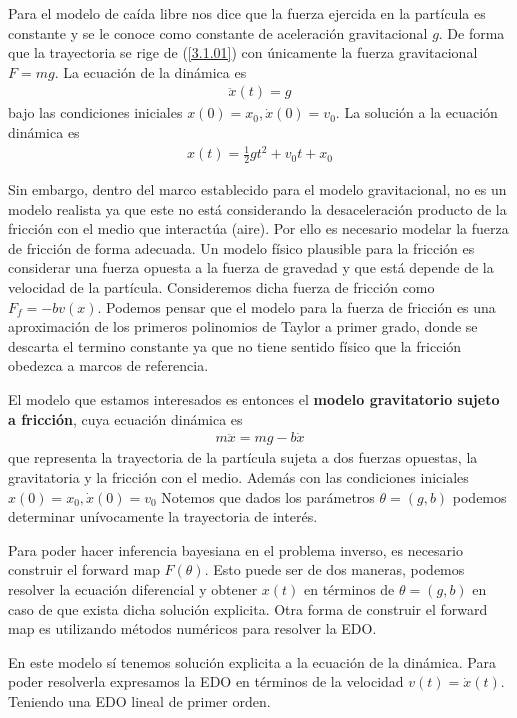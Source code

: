Para el modelo de caída libre nos dice que la fuerza ejercida en la partícula es constante y se le conoce como constante de aceleración gravitacional $g$. De forma que la trayectoria se rige de (\ref{3.1.01}) con únicamente la fuerza gravitacional $F = mg$. La ecuación de la dinámica es 
\begin{align*}
    \ddot{x}(t) = g
\end{align*}
bajo las condiciones iniciales $x(0) = x_0, \dot{x}(0) = v_0$. La solución a la ecuación dinámica es \cite{sears1986fisica}
\begin{align*}
    x(t) = \frac{1}{2}gt^2 + v_0 t + x_0
\end{align*}

Sin embargo, dentro del marco establecido para el modelo gravitacional, no es un modelo realista ya que este no está considerando la desaceleración producto de la fricción con el medio que interactúa (aire). Por ello es necesario modelar la fuerza de fricción de forma adecuada. Un modelo físico plausible para la fricción es considerar una fuerza opuesta a la fuerza de gravedad y que está depende de la velocidad de la partícula. Consideremos dicha fuerza de fricción como $F_f = -bv(x) $. Podemos pensar que el modelo para la fuerza de fricción es una aproximación de los primeros polinomios de Taylor a primer grado, donde se descarta el termino constante ya que no tiene sentido físico que la fricción obedezca a marcos de referencia. 

El modelo que estamos interesados es entonces el \textbf{modelo gravitatorio sujeto a fricción}, cuya ecuación dinámica es 
\begin{align}
    m \ddot{x} = mg - b\dot{x}
    \label{3.1.03}
\end{align}
que representa la trayectoria de la partícula sujeta a dos fuerzas opuestas, la gravitatoria y la fricción con el medio. Además con las condiciones iniciales $x(0) = x_0, \dot{x}(0) = v_0$ Notemos que dados los parámetros $\theta = (g,b)$ podemos determinar unívocamente la trayectoria de interés. 

Para poder hacer inferencia bayesiana en el problema inverso, es necesario construir el forward map $F(\theta)$. Esto puede ser de dos maneras, podemos resolver la ecuación diferencial y obtener $x(t)$ en términos de $\theta = (g,b)$ en caso de que exista dicha solución explicita. Otra forma de construir el forward map es utilizando métodos numéricos para resolver la EDO.

En este modelo sí tenemos solución explicita a la ecuación de la dinámica. Para poder resolverla expresamos la EDO en términos de la velocidad $v(t) = \dot{x}(t)$. Teniendo una EDO lineal de primer orden.

